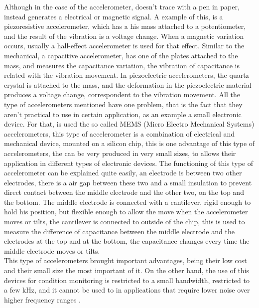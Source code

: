 Although in the case of the accelerometer, doesn't trace with a pen in paper, instead generates a electrical or magnetic signal. A example of this, is a piezoresistive accelerometer, which has a his mass attached to a potentiometer, and the result of the vibration is a voltage change. When a magnetic variation occurs, usually a hall-effect accelerometer is used for that effect.  
Similar to the mechanical, a capacitive accelerometer, has one of the plates attached to the mass, and measures the capacitance variation, the vibration of capacitance is related with the vibration movement. 
In piezoelectric accelerometers, the quartz crystal is attached to the mass, and the deformation in the piezoelectric material produces a voltage change, correspondent to the vibration movement.
All the type of accelerometers mentioned have one problem, that is the fact that they aren't practical to use in certain application, as an example a small electronic device. For that, is used the so called MEMS (Micro Electro Mechanical Systems) accelerometers, this type of accelerometer is a combination of electrical and mechanical device, mounted on a silicon chip, this is one advantage of this type of accelerometers, the can be very produced in very small sizes, to allows their application in different types of electronic devices. The functioning of this type of accelerometer can be explained quite easily, an electrode is between two other electrodes, there is a air gap between these two and a small insulation to prevent direct contact between the middle electrode and the other two, on the top and the bottom. The middle electrode is connected with a cantilever, rigid enough to hold his position, but flexible enough to allow the move when the accelerometer moves or tilts, the cantilever is connected to outside of the chip, this is used to measure the difference of capacitance between the middle electrode and the electrodes at the top and at the bottom, the capacitance changes every time the middle electrode moves or tilts.\\

This type of accelerometers brought important advantages, being their low cost and their small size the most important of it. On the other hand, the use of this devices for condition monitoring is restricted to a small bandwidth, restricted to a few kHz, and it cannot be used to in applications that require lower noise over higher frequency ranges \cite{WhatYouNeed}\cite{HowAccelerometersWork2009}.


